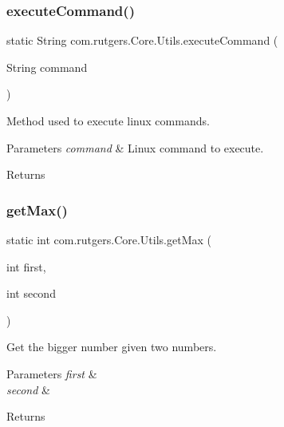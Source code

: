 \subsubsection{\texorpdfstring{execute\+Command()}{executeCommand()}}
{\footnotesize\ttfamily static String com.\+rutgers.\+Core.\+Utils.\+execute\+Command (\begin{DoxyParamCaption}\item[{String}]{command }\end{DoxyParamCaption})\hspace{0.3cm}{\ttfamily [static]}}

Method used to execute linux commands. 
\begin{DoxyParams}{Parameters}
{\em command} & Linux command to execute. \\
\hline
\end{DoxyParams}
\begin{DoxyReturn}{Returns}

\end{DoxyReturn}
\mbox{\label{classcom_1_1rutgers_1_1Core_1_1Utils_a052366fc4a329698e13f6c6633467a98}} 
\subsubsection{\texorpdfstring{get\+Max()}{getMax()}}
{\footnotesize\ttfamily static int com.\+rutgers.\+Core.\+Utils.\+get\+Max (\begin{DoxyParamCaption}\item[{int}]{first,  }\item[{int}]{second }\end{DoxyParamCaption})\hspace{0.3cm}{\ttfamily [static]}}

Get the bigger number given two numbers. 
\begin{DoxyParams}{Parameters}
{\em first} & \\
\hline
{\em second} & \\
\hline
\end{DoxyParams}
\begin{DoxyReturn}{Returns}

\end{DoxyReturn}
\mbox{\label{classcom_1_1rutgers_1_1Core_1_1Utils_a24dd8f1b7d7608b660646f798c477089}} 
